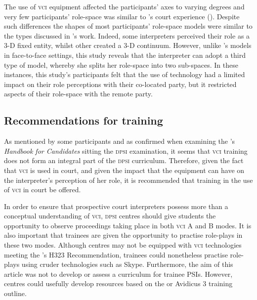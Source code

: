 \documentclass[output=paper]{langsci/langscibook}
\begin{document}
The use of \textsc{vci} equipment affected the participants’ axes to varying degrees and very few participants’ role-space was similar to \citet{Llewellyn-Jones2014}’s court experience (). Despite such differences the shapes of most participants’ role-space models were similar to the types discussed in \citet{Llewellyn-Jones2014}’s work. Indeed, some interpreters perceived their role as a 3-D fixed entity, whilst other created a 3-D continuum. However, unlike \citet{Llewellyn-Jones2014}’s models in face-to-face settings, this study reveals that the interpreter can adopt a third type of model, whereby she splits her role-space into two sub-spaces. In these instances, this study’s participants felt that the use of technology had a limited impact on their role perceptions with their co-located party, but it restricted aspects of their role-space with the remote party. 

\subsection{Recommendations for training}
As mentioned by some participants and as confirmed when examining the \citet{IoL2015}’s \textit{Handbook for Candidates} sitting the \textsc{dpsi} examination, it seems that \textsc{vci} training does not form an integral part of the \textsc{dpsi} curriculum. Therefore, given the fact that \textsc{vci} is used in court, and given the impact that the equipment can have on the interpreter’s perception of her role, it is recommended that training in the use of \textsc{vci} in court be offered.  

In order to ensure that prospective court interpreters possess more than a conceptual understanding of \textsc{vci}, \textsc{dpsi} centres should give students the opportunity to observe proceedings taking place in both \textsc{vci} A and B modes. It is also important that trainees are given the opportunity to practise role-plays in these two modes. Although centres may not be equipped with \textsc{vci} technologies meeting the \citet{TelecommunicationUnion2009}’s H323 Recommendation, trainees could nonetheless practise role-plays using cruder technologies such as Skype. Furthermore, the aim of this article was not to develop or assess a curriculum for trainee PSIs. However, centres could usefully develop resources based on the \citet{Braun2011c} or Avidicus 3 training outline. 
\end{document}
